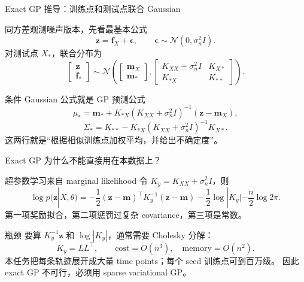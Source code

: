 \documentclass[aspectratio=169,11pt]{beamer}
\begin{document}
\begin{frame}{Exact GP 推导：训练点和测试点联合 Gaussian}
\small
\begin{block}{同方差观测噪声版本，先看最基本公式}
\footnotesize
\[
\mathbf z=\mathbf f_X+\boldsymbol\epsilon,
\qquad
\boldsymbol\epsilon\sim\mathcal N(0,\sigma_n^2I).
\]
对测试点 \(X_*\)，联合分布为
\[
\begin{bmatrix}
\mathbf z\\
\mathbf f_*
\end{bmatrix}
\sim
\mathcal N\left(
\begin{bmatrix}
\mathbf m_X\\
\mathbf m_*
\end{bmatrix},
\begin{bmatrix}
K_{XX}+\sigma_n^2I & K_{X*}\\
K_{*X} & K_{**}
\end{bmatrix}
\right).
\]
\end{block}

\begin{block}{条件 Gaussian 公式就是 GP 预测公式}
\footnotesize
\[
\mu_*=\mathbf m_*+K_{*X}(K_{XX}+\sigma_n^2I)^{-1}(\mathbf z-\mathbf m_X),
\]
\[
\Sigma_*=K_{**}-K_{*X}(K_{XX}+\sigma_n^2I)^{-1}K_{X*}.
\]
这两行就是“根据相似训练点加权平均，并给出不确定度”。
\end{block}
\end{frame}

\begin{frame}{Exact GP 为什么不能直接用在本数据上？}
\small
\begin{block}{超参数学习来自 marginal likelihood}
\footnotesize
令 \(K_y=K_{XX}+\sigma_n^2I\)，则
\[
\log p(\mathbf z|X,\theta)
=-\frac{1}{2}(\mathbf z-\mathbf m)^\top K_y^{-1}(\mathbf z-\mathbf m)
-\frac{1}{2}\log|K_y|-\frac{n}{2}\log 2\pi.
\]
第一项奖励拟合，第二项惩罚过复杂 covariance，第三项是常数。
\end{block}

\begin{block}{瓶颈}
\footnotesize
要算 \(K_y^{-1}\mathbf z\) 和 \(\log|K_y|\)，通常需要 Cholesky 分解：
\[
K_y=LL^\top,\qquad \mathrm{cost}=O(n^3),\quad \mathrm{memory}=O(n^2).
\]
本任务把每条轨迹展开成大量 time points；每个 seed 训练点可到百万级。
因此 exact GP 不可行，必须用 sparse variational GP。
\end{block}
\end{frame}
\end{document}
